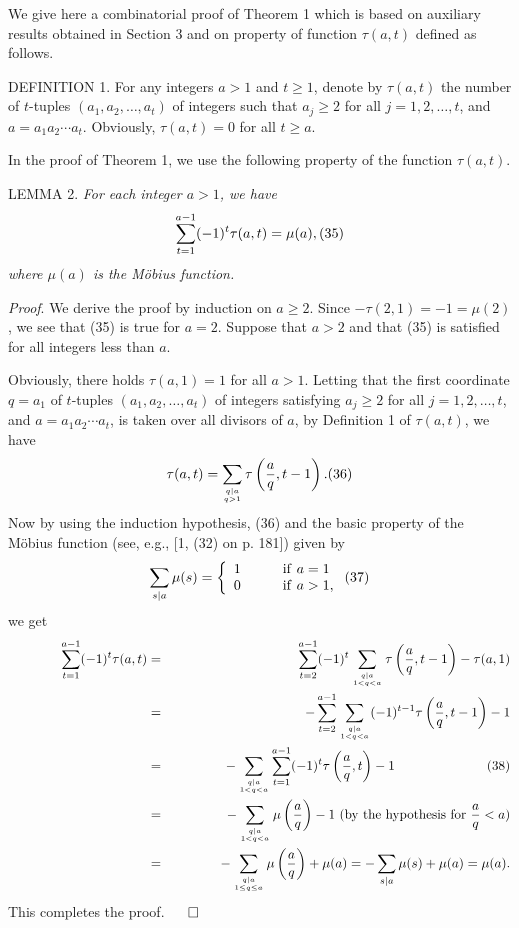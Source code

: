 \documentclass[12pt]{amsart}
\begin{document}
{%

 
We give here a combinatorial proof of Theorem 1 which is 
based on auxiliary results obtained in Section 3 and on property of function 
$\tau (a,t)$ defined as follows. 


\vspace{2mm}

D{\scriptsize EFINITION} 1. For any integers $a>1$ and $t\ge 1$, denote
by $\tau (a,t)$ the number of $t$-tuples $(a_1,a_2,\ldots,a_t)$ of integers
such that  $ a_j\ge 2$ for all $j=1,2,\ldots,t$, and $a=a_1a_2\cdots a_t$. 
Obviously,   $\tau (a,t)=0$ for all $t\ge a$.
\vspace{2mm} 

In the proof of Theorem 1, we use  the following 
property of the function $\tau (a,t)$. 
\vspace{2mm}

L{\scriptsize EMMA} 2. {\it For each  integer $a>1$, we have
     $$
\sum_{t=1}^{a-1}(-1)^t\tau (a,t)=\mu(a), \relax(35)
    $$
where $\mu(a)$ is the M\"{o}bius function. }

\vspace{2mm} 

{\it Proof}. We derive the proof by induction on $a\ge 2$.
Since $-\tau (2,1)=-1=\mu(2)$, we see that (35) is true for $a=2$. 
Suppose that $a>2$ and that (35) is satisfied for all integers less than 
$a$. 

Obviously, there holds $\tau (a,1)=1$ for all $a>1$. Letting that  the first 
coordinate $q=a_1$ of $t$-tuples $(a_1,a_2,\ldots,a_t)$ of integers
satisfying $a_j\ge 2$ for all $j=1,2,\ldots,t$, and $a=a_1a_2\cdots a_t$,
is taken
over all divisors of $a$, 
by Definition 1 of  $\tau (a,t)$, we have
     $$
\tau (a,t)=\sum_{q|a\atop q>1}\tau\left(\frac{a}{q},t-1\right).\relax(36)   
  $$
Now  by using the induction hypothesis, (36) and the basic property of 
the M\"{o}bius function (see, e.g., [1, (32) on p. 181]) given by
  $$
\sum_{s|a}\mu(s)=\left\{\begin{array}{rl}
    1 & \qquad {\rm if}\,\, a=1 \\
    0 & \qquad {\rm if}\,\, a>1,
           \end{array}\right.\relax(37) 
      $$
 we get
    \begin{eqnarray*}
\qquad\qquad \sum_{t=1}^{a-1}(-1)^t\tau (a,t)&=&\sum_{t=2}^{a-1}(-1)^t
\sum_{q|a\atop 1<q<a}\tau\left(\frac{a}{q},t-1\right)-\tau(a,1)\\
&=&-\sum_{t=2}^{a-1}
\sum_{q|a\atop 1<q<a}(-1)^{t-1}\tau\left(\frac{a}{q},t-1\right)-1\\
\qquad\qquad\qquad &=&-\sum_{q|a\atop 1<q<a}\sum_{t=1}^{a-1}(-1)^{t}\tau\left(\frac{a}{q},t\right)
-1\qquad\qquad\qquad\quad (38)\\
&=&\qquad\qquad
-\sum_{ q|a\atop 1<q<a}\mu\left(\frac{a}{q}\right)-1
\,\, ({\rm by\,\, the\,\, hypothesis\,\, for\,\,}\frac{a}{q}<a)\\
&=&-\sum_{q|a\atop 1\le q\le a}\mu\left(\frac{a}{q}\right)+\mu(a)
= -\sum_{s|a}\mu(s)+\mu(a)=\mu(a).
    \end{eqnarray*}
This completes the proof. 
\hfill$\qed$
\vspace{2mm}

}
\end{document}
